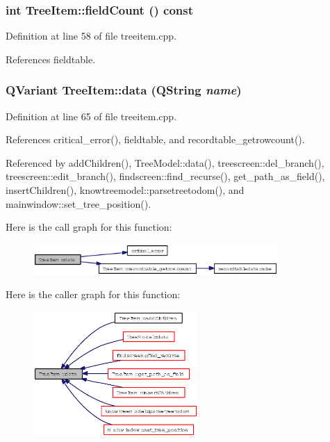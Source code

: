 \subsubsection{\setlength{\rightskip}{0pt plus 5cm}int Tree\-Item::field\-Count () const}\label{classTreeItem_d2c76cd733694499499c0b2e423756f5}




Definition at line 58 of file treeitem.cpp.

References fieldtable.
\subsubsection{\setlength{\rightskip}{0pt plus 5cm}QVariant Tree\-Item::data (QString {\em name})}\label{classTreeItem_30f59edac140c6fa48b5f09315e15a65}




Definition at line 65 of file treeitem.cpp.

References critical\_\-error(), fieldtable, and recordtable\_\-getrowcount().

Referenced by add\-Children(), Tree\-Model::data(), treescreen::del\_\-branch(), treescreen::edit\_\-branch(), findscreen::find\_\-recurse(), get\_\-path\_\-as\_\-field(), insert\-Children(), knowtreemodel::parsetreetodom(), and mainwindow::set\_\-tree\_\-position().

Here is the call graph for this function:\begin{figure}[H]
\begin{center}
\leavevmode
\includegraphics[width=264pt]{classTreeItem_30f59edac140c6fa48b5f09315e15a65_cgraph}
\end{center}
\end{figure}


Here is the caller graph for this function:\begin{figure}[H]
\begin{center}
\leavevmode
\includegraphics[width=178pt]{classTreeItem_30f59edac140c6fa48b5f09315e15a65_icgraph}
\end{center}
\end{figure}
